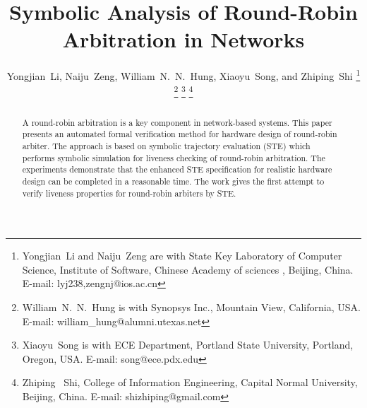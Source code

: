 \documentclass[final]{IEEEtran}
\begin{document}
\title{Symbolic Analysis of Round-Robin Arbitration in Networks
}


\author{Yongjian~Li, Naiju~Zeng, William~N.~N.~Hung, Xiaoyu~Song, and Zhiping~Shi \thanks{%
Yongjian~Li and Naiju~Zeng are with State Key Laboratory of Computer
Science, Institute of Software, Chinese Academy of sciences ,
Beijing, China.
E-mail: lyj238,zengnj@ios.ac.cn}%
\thanks{William~N.~N.~Hung is with Synopsys Inc., Mountain View,
California, USA.
E-mail: william\_hung@alumni.utexas.net}%
\thanks{Xiaoyu~Song is with ECE Department, Portland State
University, Portland, Oregon, USA. E-mail: song@ece.pdx.edu}
\thanks{Zhiping~ Shi,  College of Information Engineering, Capital Normal
University, Beijing, China. E-mail: shizhiping@gmail.com}}

\maketitle

\begin{abstract}
A round-robin arbitration is a key component in network-based
systems. This paper presents an automated formal verification method
for hardware design of round-robin arbiter. The approach is based on
symbolic trajectory evaluation (STE) which performs symbolic
simulation for liveness checking of round-robin arbitration. The
experiments demonstrate that the enhanced STE specification for
realistic hardware design can be completed in a reasonable time. The
work gives the first attempt to verify liveness properties for
round-robin arbiters by STE.
\end{abstract}
\end{document}
